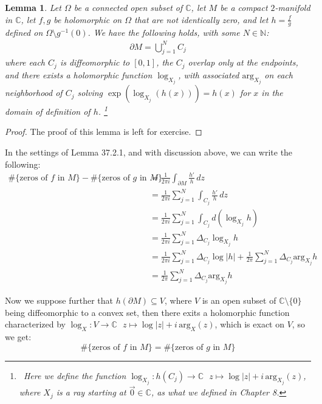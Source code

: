 \documentclass[15pt]{book}
\theoremstyle{break}
\theoremstyle{break}
\newtheorem{lem}{Lemma}[thm]
\newcommand{\N}{\mathbb{N}}
\newcommand{\Complex}{\mathbb{C}}
\begin{document}
\begin{lem}
Let $\Omega$ be a connected open subset of $\Complex$, let $M$ be a compact $2$-manifold in $\Complex$, let $f,g$ be holomorphic on $\Omega$ that are not identically zero, and let $h = \frac{f}{g}$ defined on $\Omega \setminus g^{-1}(0)$. We have the following holds, with some $N \in \N$:
\begin{align*}
\partial M  = \bigcup_{j=1}^N C_j
\end{align*} 
where each $C_j$ is diffeomorphic to $[0,1]$, the $C_j$ overlap only at the endpoints, and there exists a holomorphic function $\log_{X_j}$, with associated $\text{arg}_{X_j} $ on each neighborhood of $C_j$ solving $\exp(\log_{X_j} (h(x))) = h(x)$ for $x $ in the domain of definition of $h$. \footnote{\  Here we define the function $\log_{X_j}: h(C_j) \to \Complex \ \ \  z \mapsto \log |z| + i\, \text{arg}_{X_j}(z)$, where $X_j$ is a ray starting at $\vec{0}\in \Complex$, as what we defined in Chapter 8.}
\end{lem}
\begin{proof}
The proof of this lemma is left for exercise.
\end{proof}



In the settings of Lemma 37.2.1, and with discussion above, we can write the following:
\begin{align*}
\#\{\text{zeros of }f \text{ in }M\} - \#\{\text{zeros of }g \text{ in }M\}  &= \frac{1}{2\pi i}\int_{\partial M}\frac{h'}{h}\, dz \\
&= \frac{1}{2\pi i}\sum_{j=1}^N \int_{C_j}\frac{h'}{h}\, dz\\
&= \frac{1}{2\pi i}\sum_{j=1}^N \int_{C_j} d(\log_{X_j} h)\\
&= \frac{1}{2\pi i}\sum_{j=1}^N \Delta_{C_j}\log_{X_j} h\\
&= \frac{1}{2\pi i} \sum_{j=1}^{N} \Delta_{C_j}\log|h| + \frac{1}{2\pi}\sum_{j=1}^N \Delta_{C_j} \text{arg}_{X_j} h \\
&= \frac{1}{2\pi} \sum_{j=1}^N \Delta_{C_j} \text{arg}_{X_j} h
\end{align*}

Now we suppose further that $h(\partial M) \subseteq V$, where $V$ is an open subset of $\Complex \setminus \{0\}$ being diffeomorphic to a convex set, then there exits a holomorphic function characterized by $\log_{X}:V \to \Complex\ \ \ z\mapsto \log|z|+i\,\text{arg}_{X}(z)$, which is exact on $V$, so we get:
$$\# \{\text{zeros of }f\text{ in }M\}=\# \{\text{zeros of }g\text{ in }M\} $$
\end{document}

